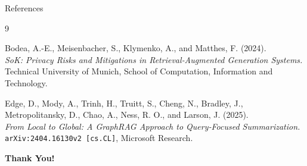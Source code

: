 \documentclass[aspectratio=169,xcolor=dvipsnames]{beamer}
\begin{document}
	\begin{frame}{References}
		
		\footnotesize
		
		\begin{thebibliography}{9}
			
			Bodea, A.-E., Meisenbacher, S., Klymenko, A., and Matthes, F. (2024).\\
			\textit{SoK: Privacy Risks and Mitigations in Retrieval‑Augmented Generation Systems.}\\
			Technical University of Munich, School of Computation, Information and Technology.
			
			\vspace{0.6em}
			
			Edge, D., Mody, A., Trinh, H., Truitt, S., Cheng, N., Bradley, J., Metropolitansky, D., Chao, A., Ness, R. O., and Larson, J. (2025).\\
			\textit{From Local to Global: A GraphRAG Approach to Query‑Focused Summarization.}\\
			\texttt{arXiv:2404.16130v2 [cs.CL]}, Microsoft Research.
			
		\end{thebibliography}
		
	\end{frame}
	
	\begin{frame}
		\Huge{\centerline{\textbf{Thank You!}}}
	\end{frame}
	
\end{document}
